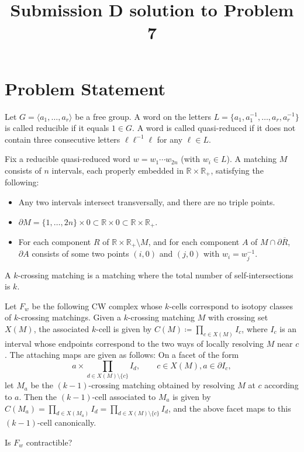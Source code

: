 \documentclass[12pt]{article}
\newcommand{\RR}{\mathbb{R}}
\newcommand{\bdy}{\partial}
\newcommand{\defeq}{\coloneqq}
\begin{document}
\title{Submission D solution to Problem 7}
\date{}
\maketitle

\section*{Problem Statement}

Let $G=\langle a_1,\dots,a_r\rangle$ be a free group. A word on the
letters $L=\{a_1,a_1^{-1},\dots,a_r,a_r^{-1}\}$ is called reducible
if it equals $1\in G$. A word is called quasi-reduced if it does not
contain three consecutive letters $\ell\ell^{-1}\ell$ for any
$\ell \in L$.

Fix a reducible quasi-reduced word $w=w_1\cdots w_{2n}$ (with $w_i\in L$). A
matching $M$ consists of $n$ intervals, each properly embedded in
$\RR\times\RR_+$, satisfying the following:
\begin{itemize}
\item Any two intervals intersect
  transversally, and there are no triple points.
\item $\bdy M=\{1,\dots,2n\}\times 0\subset\RR\times 0\subset
  \RR\times\RR_+$.
\item For each component $R$ of
  $\RR\times\RR_+\setminus M$, and for each component $A$ of $M\cap \bdy\overline{R}$, $\bdy A$ consists of some two points $(i,0)$ and $(j,0)$ with $w_i=w_j^{-1}$. 
\end{itemize}
A $k$-crossing
matching is a matching where the total number of self-intersections
is $k$.

Let $F_w$ be the following CW complex whose $k$-cells correspond to
isotopy classes of $k$-crossing matchings. Given a $k$-crossing
matching $M$ with crossing set $X(M)$, the associated $k$-cell is
given by $C(M)\defeq \prod_{c\in X(M)}I_c$, where $I_c$ is an
interval whose endpoints correspond to the two ways of locally
resolving $M$ near $c$. The attaching maps are given as follows: On
a facet of the form
\[
  a\times\prod_{d\in X(M)\setminus\{c\}}I_{d},\qquad c\in X(M),a\in \bdy I_c,
\]
let $M_a$ be the $(k-1)$-crossing matching obtained by resolving $M$
at $c$ according to $a$. Then the $(k-1)$-cell associated to $M_a$
is given by
$C(M_a)=\prod_{d\in X(M_a)}I_d=\prod_{d\in X(M)\setminus\{c\}}I_{d}$, and the
above facet maps to this $(k-1)$-cell canonically.

Is $F_w$ contractible?
\end{document}
